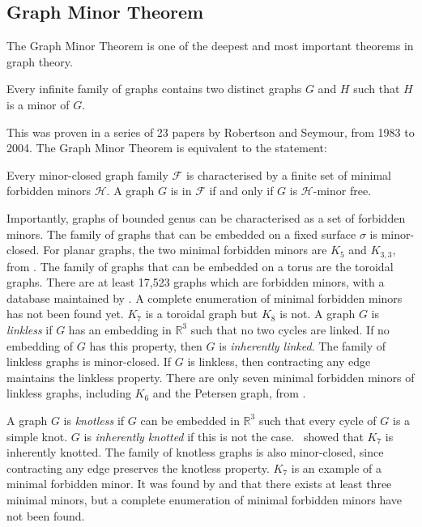  \subsection{Graph Minor Theorem}\label{sec:Graph Minor Theorem}
The Graph Minor Theorem is one of the deepest and most important theorems in graph theory. 
\begin{theorem}
	Every infinite family of graphs contains two distinct graphs \(G\) and \(H\) such that \(H\) is a minor of \(G\).
\end{theorem}
This was proven in a series of 23 papers by Robertson and Seymour, from 1983 to 2004.
The Graph Minor Theorem is equivalent to the statement:
\begin{theorem}
	Every minor-closed graph family $\mathcal{F}$ is characterised by a finite set of minimal forbidden minors $\mathcal{H}$. A graph $G$ is in $\mathcal{F}$ if and only if $G$ is $\mathcal{H}$-minor free.
\end{theorem}
Importantly, graphs of bounded genus can be characterised as a set of forbidden minors. The family of graphs that can be embedded on a fixed surface $\sigma$ is minor-closed. 
For planar graphs, the two minimal forbidden minors are \(K_5\) and \(K_{3,3}\), from \textcite{wagnerUeberEigenschaftEbenen1937}. 
The family of graphs that can be embedded on a torus are the toroidal graphs. There are at least 17,523 graphs which are forbidden minors, with a database maintained by \textcite{myrvoldLargeSetTorus2018}. A complete enumeration of minimal forbidden minors has not been found yet. $K_7$ is a toroidal graph but $K_8$ is not.
A graph $G$ is \textit{linkless} if $G$ has an embedding in $\mathbb{R}^3$ such that no two cycles are linked. If no embedding of $G$ has this property, then $G$ is \textit{inherently linked}. The family of linkless graphs is minor-closed. If $G$ is linkless, then contracting any edge maintains the linkless property. There are only seven minimal forbidden minors of linkless graphs, including $K_6$ and the Petersen graph, from \textcite{robertsonSachsLinklessEmbedding1995}. 

A graph $G$ is \textit{knotless} if $G$ can be embedded in $\mathbb{R}^3$ such that every cycle of $G$ is a simple knot. $G$ is \textit{inherently knotted} if this is not the case.\ \textcite{conwayKnotsLinksSpatial1983} showed that $K_7$ is inherently knotted. The family of knotless graphs is also minor-closed, since contracting any edge preserves the knotless property. $K_7$ is an example of a minimal forbidden minor. It was found by \textcite{conwayKnotsLinksSpatial1983} and \textcite{foisyIntrinsicallyKnottedGraphs2002,foisyNewlyRecognizedIntrinsically2003} that there exists at least three minimal minors, but a complete enumeration of minimal forbidden minors have not been found. 